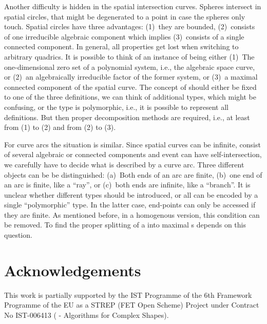 Another difficulty is hidden in the spatial intersection curves.
Spheres intersect in spatial circles, that might be degenerated
to a point in case the spheres only touch. Spatial circles
have three advantages: (1)~they are bounded, (2)~consists of one irreducible
algebraic component which implies (3)~consists of a single
connected component.
In general, all properties get lost when switching to arbitrary quadrics.
It is possible to think of an instance of  being either
(1)~The one-dimensional zero set of a polynomial
system, i.e., the algebraic space curve, or (2)~an algebraically 
irreducible factor of the former system, or (3)~a maximal connected component
of the spatial curve. 
The concept of  should either be fixed to one of the
three definitions, we can think of additional types, which might be
confusing, or the type is polymorphic, i.e., it is possible
to represent all definitions. But then proper decomposition
methods are required, i.e., at least from (1) to (2) and from (2) to (3).

For curve arcs the situation is similar. Since spatial curves can be infinite,
consist of several algebraic or connected components and event can have 
self-intersection, we carefully have to decide what is described by a curve
arc. Three different objects can be be distinguished: (a)~Both ends of an 
arc are finite, (b)~one end of an arc is finite, like a ``ray'', or 
(c)~both ends are infinite, like a ``branch''. It is unclear
whether different types should be introduced, or
all can be encoded by a single ``polymorphic'' type. In the latter
case, end-points can only be accessed if they are finite. As mentioned before,
in a homogenous version, this condition can be removed. To find the 
proper splitting of a  into maximal s depends
on this question.

\section{Acknowledgements}

This work is partially supported by the IST Programme of the 6th
Framework Programme of the EU as a STREP (FET Open Scheme) Project
under Contract No IST-006413 ( -
Algorithms for Complex Shapes).
